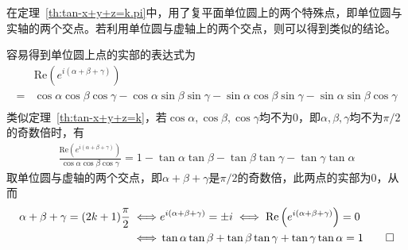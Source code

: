 \begin{example}
  在定理~\ref{th:tan-x+y+z=k.pi}中，用了复平面单位圆上的两个特殊点，即单位圆与实轴的两个交点。若利用单位圆与虚轴上的两个交点，则可以得到类似的结论。

  \begin{center}
  \end{center}
  容易得到单位圆上点的实部的表达式为
  \begin{align*}
        & \mathrm{Re}\left( e^{i(\alpha + \beta + \gamma)}\right) \\
    ={} & \cos\alpha\cos\beta\cos\gamma - \cos\alpha\sin\beta\sin\gamma
          - \sin\alpha\cos\beta\sin\gamma - \sin\alpha\sin\beta\cos\gamma\\
  \end{align*}
  类似定理~\ref{th:tan-x+y+z=k}，若$\cos\alpha, \cos\beta, \cos\gamma$均不为0，即$\alpha, \beta, \gamma$均不为$\pi/2$的奇数倍时，有
  \begin{align*}
    \frac{\mathrm{Re}\left( e^{i(\alpha + \beta + \gamma)}\right)}{\cos\alpha\cos\beta\cos\gamma}
    ={} 1 - \tan\alpha\tan\beta - \tan\beta\tan\gamma - \tan\gamma\tan\alpha
  \end{align*}
  取单位圆与虚轴的两个交点，即$\alpha + \beta + \gamma$是$\pi/2$的奇数倍，此两点的实部为0，从而
  \begin{align*}
    \alpha + \beta + \gamma = (2k + 1)\frac\pi2
    \iff & e^{i(\alpha + \beta + \gamma)} = \pm i 
    \iff \mathrm{Re}\left(e^{i(\alpha + \beta + \gamma)}\right) = 0\\
    \iff & \tan\alpha\tan\beta + \tan\beta\tan\gamma + \tan\gamma\tan\alpha = 1\qedhere\\
  \end{align*}
\end{example}

